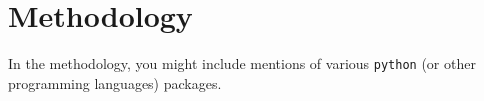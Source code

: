 \section{Methodology}
In the methodology, you might include mentions of various \texttt{python} (or other programming languages) packages.